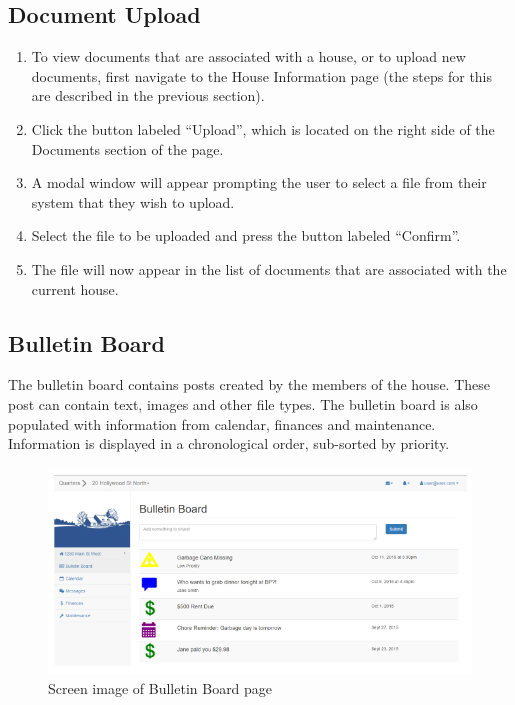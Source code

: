 \documentclass[12pt]{article}
\begin{document}
    \subsection{Document Upload} %
    \begin{enumerate}
        \item To view documents that are associated with a house, or to upload new documents, first navigate to the House Information page (the steps for this are described in the previous section).
        \item Click the button labeled ``Upload'', which is located on the right side of the Documents section of the page.
        \item A modal window will appear prompting the user to select a file from their system that they wish to upload.
        \item Select the file to be uploaded and press the button labeled ``Confirm''.
        \item The file will now appear in the list of documents that are associated with the current house.
    \end{enumerate}

    \subsection{Bulletin Board}
    The bulletin board contains posts created by the members of the house. These post can contain text, images and other file types.
    The bulletin board is also populated with information from calendar, finances and maintenance.
    Information is displayed in a chronological order, sub-sorted by priority.

    \begin{figure}
        \centering
        \includegraphics[width=\textwidth]{bulletin}
        \caption{Screen image of Bulletin Board page}
        \label{fig:bulletin}
    \end{figure}
\end{document}
